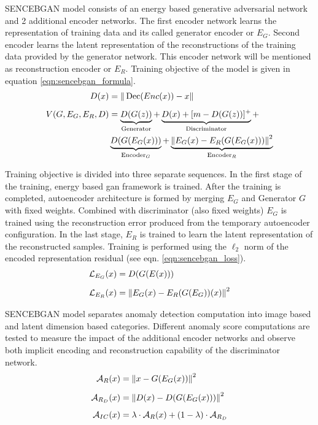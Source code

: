 SENCEBGAN model consists of an energy based generative adversarial network and 2 additional encoder
networks. The first encoder network learns the representation of training data and its called
generator encoder or $E_{G}$. Second encoder learns the latent representation of the reconstructions
of the training data provided by the generator network. This encoder network will be mentioned as
reconstruction encoder or $E_{R}$. Training objective of the model is given in equation
\ref{eqn:sencebgan_formula}.
\begin{equation}
	\begin{aligned}
		D(x)&=\|\operatorname{Dec}(E n c(x))-x\|\\[5pt]
		V(G,E_{G},E_{R}, D) &= \underbrace{D(G(z))}_{\text{Generator}} + \underbrace{D(x)+[m-D(G(z))]^{+}}_{\text{Discriminator}} +\\ & \underbrace{D(G(E_{G}(x)))}_{\text{Encoder}_{G}} + \underbrace{\left\lVert E_{G}(x) - E_{R}(G(E_{G}(x)))\right\rVert^2}_{\text{Encoder}_{R}}
	\end{aligned}
	\label{eqn:sencebgan_formula}
\end{equation}

Training objective is divided into three separate sequences. In the first stage of the training,
energy based gan framework is trained. After the training is completed, autoencoder architecture is
formed by merging $E_{G}$ and Generator $G$ with fixed weights. Combined with discriminator (also
fixed weights) $E_{G}$ is trained using the reconstruction error produced from the temporary
autoencoder configuration. In the last stage, $E_{R}$ is trained to learn the latent representation
of the reconstructed samples. Training is performed using the $\ell_{2}$ norm of the encoded
representation residual (see eqn. \ref{eqn:sencebgan_loss}). 
\begin{equation}
	\label{eqn:sencebgan_loss}
	\begin{aligned}
		\mathcal{L}_{E_{G}}(x) &= D(G(E(x))) \\[5pt]
		\mathcal{L}_{E_{R}}(x) &= \left\lVert E_{G}(x) - E_{R}(G(E_{G}))(x)\right\rVert^2
 	\end{aligned}
\end{equation}

SENCEBGAN model separates anomaly detection computation into image based and latent dimension based
categories. Different anomaly score computations are tested to measure the impact of the additional
encoder networks and observe both implicit encoding and reconstruction capability of the
discriminator network. 
\begin{equation}
	\label{eqn:sencebgan_eqn_im}
	\begin{aligned}
	\mathcal{A}_{R}(x) & = \left\lVert x - G(E_{G}(x))\right\rVert^ 2 \\[5pt]
	\mathcal{A}_{R_{D}}(x) & = \left\lVert D(x) - D(G(E_{G}(x)))\right\rVert^2\\[5pt]
	\mathcal{A}_{IC}(x) & = \lambda \cdot \mathcal{A}_{R}(x) + (1 - \lambda) \cdot \mathcal{A}_{R_{D}}
	\end{aligned}
\end{equation}

